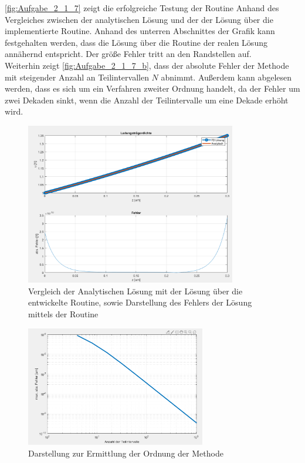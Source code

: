\documentclass[
	pagesize,
	fontsize=12pt,
	paper=a4,
	oneside,
   reqno
]{scrartcl}
\begin{document}
\autoref{fig:Aufgabe_2_1_7} zeigt die erfolgreiche Testung der Routine Anhand des Vergleiches zwischen der analytischen Lösung und der der Lösung über die implementierte Routine. Anhand des unterren Abschnittes der Grafik kann festgehalten werden, dass die Lösung über die Routine der realen Lösung annähernd entspricht. Der größe Fehler tritt an den Randstellen auf. \\

Weiterhin zeigt \autoref{fig:Aufgabe_2_1_7_b}, dass der absolute Fehler der Methode mit steigender Anzahl an Teilintervallen $N$ abnimmt. Außerdem kann abgelesen werden, dass es sich um ein Verfahren zweiter Ordnung handelt, da der Fehler um zwei Dekaden sinkt, wenn die Anzahl der Teilintervalle um eine Dekade erhöht wird.

\begin{figure}[H]
   \centering
   \includegraphics[width=0.82\textwidth]{Bilder/Aufgabe_2_1_7.png}
   \caption[Test der Routine linear stationär]{Vergleich der Analytischen Lösung mit der Lösung über die entwickelte Routine, sowie Darstellung des Fehlers der Lösung mittels der Routine}
   \label{fig:Aufgabe_2_1_7}
\end{figure}

\begin{figure}[H]
   \centering
   \includegraphics[width=0.7\textwidth]{Bilder/Aufgabe_2_1_7_b.png}
   \caption[Ordnung der Methode linear stationär]{Darstellung zur Ermittlung der Ordnung der Methode}
   \label{fig:Aufgabe_2_1_7_b}
\end{figure}
\end{document}
